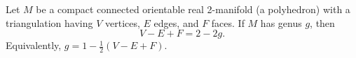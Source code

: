 Let $M$ be a compact connected orientable real 2-manifold (a polyhedron) with a triangulation having $V$ vertices, $E$ edges, and $F$ faces. If $M$ has genus $g$, then
$$V - E + F = 2 - 2g.$$
Equivalently, $g = 1 - \frac{1}{2}(V - E + F)$.
